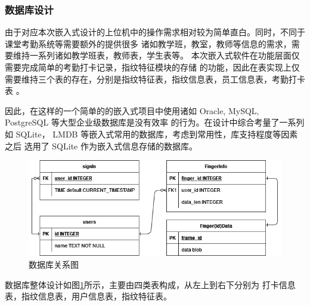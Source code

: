     \subsubsection{数据库设计}

    由于对应本次嵌入式设计的上位机中的操作需求相对较为简单直白。同时，不同于课堂考勤系统等需要额外的提供很多
    诸如教学班，教室，教师等信息的需求，需要维持一系列诸如教学班表，教师表，学生表等。\cite{基于WiFi探针的智能考勤系统设计}
    本次嵌入式软件在功能层面仅需要完成简单的考勤打卡记录，指纹特征模块的存储
    的功能，因此在表实现上仅需要维持三个表的存在，分别是指纹特征表，指纹信息表，员工信息表，考勤打卡表
    。

    因此，在这样的一个简单的的嵌入式项目中使用诸如 Oracle, MySQL, PostgreSQL 等大型企业级数据库是没有效率
    的行为。在设计中综合考量了一系列如 SQLite， LMDB 等嵌入式常用的数据库，考虑到常用性，库支持程度等因素之后
    选用了 SQLite 作为嵌入式信息存储的数据库。

    \begin{figure}[ht]
    \centering
    \includegraphics[scale=0.6]{imgs/数据库关系图.jpg}
    \caption{数据库关系图}    \label{fig:db-total}
    \end{figure}

    数据库整体设计如图\ref{fig:db-total}所示，主要由四类表构成，从左上到右下分别为
    打卡信息表，指纹信息表，用户信息表，指纹特征表。

